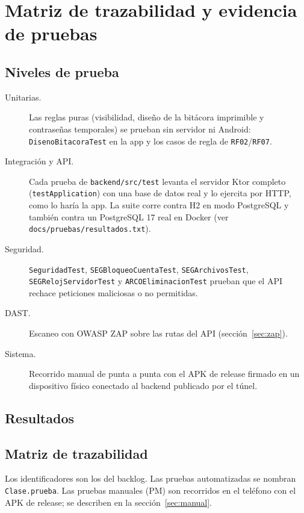 \section{Matriz de trazabilidad y evidencia de pruebas}

\subsection{Niveles de prueba}
\begin{description}
	\item[Unitarias.] Las reglas puras (visibilidad, diseño de la bitácora imprimible y contraseñas temporales) se prueban sin servidor ni Android: \texttt{Diseno\allowbreak{}Bitacora\allowbreak{}Test} en la app y los casos de regla de \texttt{RF02}/\texttt{RF07}.
	\item[Integración y API.] Cada prueba de \texttt{backend/\allowbreak{}src/\allowbreak{}test} levanta el servidor Ktor completo (\texttt{test\allowbreak{}Application}) con una base de datos real y lo ejercita por HTTP, como lo haría la app. La suite corre contra H2 en modo PostgreSQL y también contra un PostgreSQL 17 real en Docker (ver \texttt{docs/\allowbreak{}pruebas/\allowbreak{}resultados.\allowbreak{}txt}).
	\item[Seguridad.] \texttt{Seguridad\allowbreak{}Test}, \texttt{SEGBloqueo\allowbreak{}Cuenta\allowbreak{}Test}, \texttt{SEGArchivos\allowbreak{}Test}, \texttt{SEGReloj\allowbreak{}Servidor\allowbreak{}Test} y \texttt{ARCOEliminacion\allowbreak{}Test} prueban que el API rechace peticiones maliciosas o no permitidas.
	\item[DAST.] Escaneo con OWASP ZAP sobre las rutas del API (sección~\ref{sec:zap}).
	\item[Sistema.] Recorrido manual de punta a punta con el APK de release firmado en un dispositivo físico conectado al backend publicado por el túnel.
\end{description}

\subsection{Resultados}


\subsection{Matriz de trazabilidad}
Los identificadores son los del backlog. Las pruebas automatizadas se nombran \texttt{Clase.\allowbreak{}prueba}. Las pruebas manuales (PM) son recorridos en el teléfono con el APK de release; se describen en la sección~\ref{sec:manual}.


